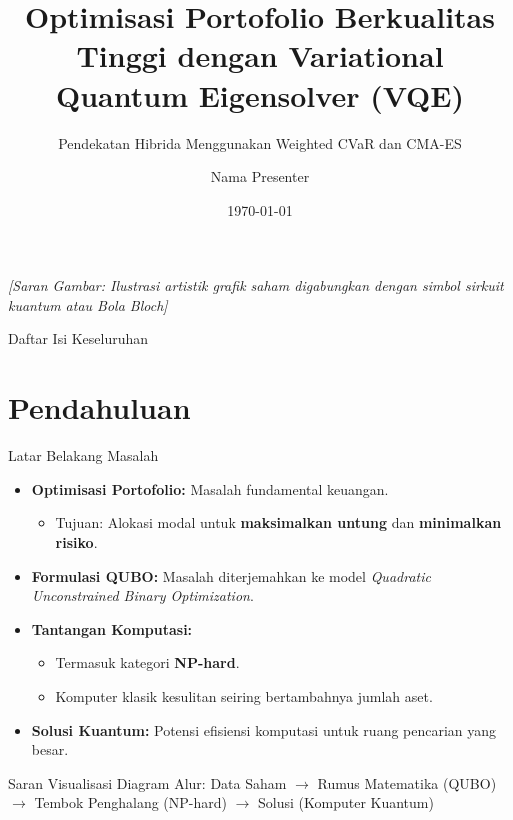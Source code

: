 \documentclass[10pt]{beamer}
\title[Optimisasi Portofolio VQE]{Optimisasi Portofolio Berkualitas Tinggi dengan Variational Quantum Eigensolver (VQE)}
\subtitle{Pendekatan Hibrida Menggunakan Weighted CVaR dan CMA-ES}
\author{Nama Presenter} %
\institute[Nama Institusi]{Departemen Fisika / Komputasi \\ Nama Institusi Anda}
\date{\today}
\begin{document}
\begin{frame}
    \titlepage
    \begin{center}
        \textit{\footnotesize [Saran Gambar: Ilustrasi artistik grafik saham digabungkan dengan simbol sirkuit kuantum atau Bola Bloch]}
    \end{center}
\end{frame}

\begin{frame}{Daftar Isi Keseluruhan}
    \tableofcontents
\end{frame}

\section{Pendahuluan}
\begin{frame}{Latar Belakang Masalah}
    \begin{itemize}
        \item \textbf{Optimisasi Portofolio:} Masalah fundamental keuangan.
        \begin{itemize}
            \item Tujuan: Alokasi modal untuk \textbf{maksimalkan untung} dan \textbf{minimalkan risiko}.
        \end{itemize}
        \item \textbf{Formulasi QUBO:} Masalah diterjemahkan ke model \textit{Quadratic Unconstrained Binary Optimization}.
        \item \textbf{Tantangan Komputasi:}
        \begin{itemize}
            \item Termasuk kategori \textbf{NP-hard}.
            \item Komputer klasik kesulitan seiring bertambahnya jumlah aset.
        \end{itemize}
        \item \textbf{Solusi Kuantum:} Potensi efisiensi komputasi untuk ruang pencarian yang besar.
    \end{itemize}
    
    \vspace{0.5cm}
    \begin{alertblock}{Saran Visualisasi}
        \centering
        Diagram Alur: Data Saham $\rightarrow$ Rumus Matematika (QUBO) $\rightarrow$ Tembok Penghalang (NP-hard) $\rightarrow$ Solusi (Komputer Kuantum)
    \end{alertblock}
\end{frame}
\end{document}
